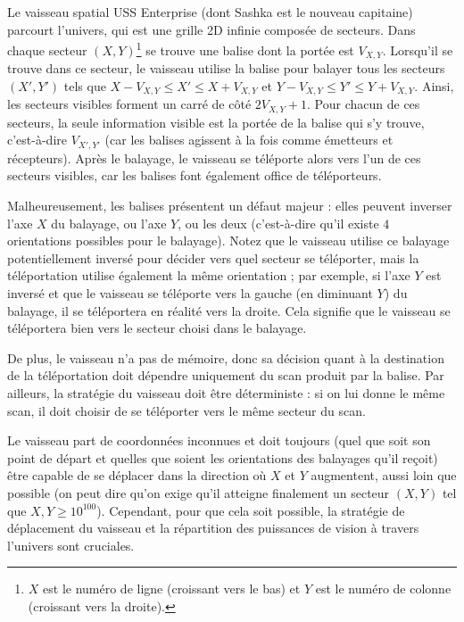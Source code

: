 \documentclass[12pt]{article}
\begin{document}
\renewcommand{\headerLang}{French}
\renewcommand{\problemName}{AB13. Vision}

\renewcommand{\headerLeft}{IATI Day 1, Senior group}
\renewcommand{\headerRightFirst}{XVII INTERNATIONAL ADVANCED TOURNAMENT IN INFORMATICS}
\renewcommand{\headerRightSecond}{ONLINE 2026}

\renewcommand{\tl}{$5$ s}
\renewcommand{\ml}{$1024$ MB}
\problem{Task \problemName}

Le vaisseau spatial USS Enterprise (dont Sashka est le nouveau capitaine) parcourt l'univers, qui est une grille 2D infinie composée de secteurs. Dans chaque secteur $(X, Y)$\footnote{$X$ est le numéro de ligne (croissant vers le bas) et $Y$ est le numéro de colonne (croissant vers la droite).} se trouve une balise dont la portée est $V_{X, Y}$. Lorsqu'il se trouve dans ce secteur, le vaisseau utilise la balise pour balayer tous les secteurs $(X', Y')$ tels que $X - V_{X, Y} \leq X' \leq X + V_{X, Y}$ et  $Y - V_{X, Y} \leq Y' \leq Y + V_{X, Y}$. Ainsi, les secteurs visibles forment un carré de côté $2V_{X, Y} + 1$. Pour chacun de ces secteurs, la seule information visible est la portée de la balise qui s'y trouve, c'est-à-dire $V_{X', Y'}$ (car les balises agissent à la fois comme émetteurs et récepteurs). Après le balayage, le vaisseau se téléporte alors vers l'un de ces secteurs visibles, car les balises font également office de téléporteurs.

Malheureusement, les balises présentent un défaut majeur : elles peuvent inverser l'axe $X$ du balayage, ou l'axe $Y$, ou les deux (c'est-à-dire qu'il existe $4$ orientations possibles pour le balayage). Notez que le vaisseau utilise ce balayage potentiellement inversé pour décider vers quel secteur se téléporter, mais la téléportation utilise également la même orientation ; par exemple, si l'axe $Y$ est inversé et que le vaisseau se téléporte vers la gauche (en diminuant $Y$) du balayage, il se téléportera en réalité vers la droite. Cela signifie que le vaisseau se téléportera bien vers le secteur choisi dans le balayage.

De plus, le vaisseau n'a pas de mémoire, donc sa décision quant à la destination de la téléportation doit dépendre uniquement du scan produit par la balise. Par ailleurs, la stratégie du vaisseau doit être déterministe : si on lui donne le même scan, il doit choisir de se téléporter vers le même secteur du scan.

Le vaisseau part de coordonnées inconnues et doit toujours (quel que soit son point de départ et quelles que soient les orientations des balayages qu’il reçoit) être capable de se déplacer dans la direction où $X$ et $Y$ augmentent, aussi loin que possible (on peut dire qu’on exige qu’il atteigne finalement un secteur $(X, Y)$ tel que $X, Y \geq 10^{100}$). Cependant, pour que cela soit possible, la stratégie de déplacement du vaisseau et la répartition des puissances de vision à travers l'univers sont cruciales.
\end{document}
